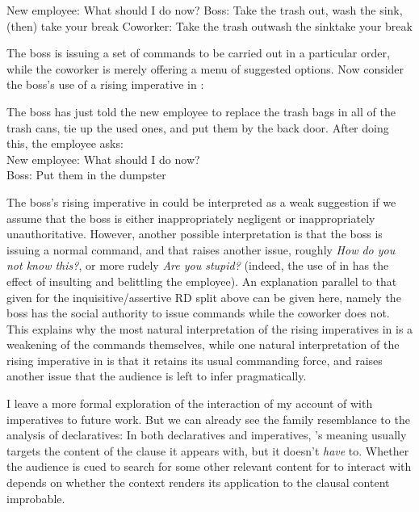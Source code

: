 \documentclass[output=paper,colorlinks,citecolor=brown]{langscibook}
\begin{document}
	\exa New employee: What should I do now?
	\ea Boss: Take the trash out, wash the sink, (then) take your break\fall \label{boss}
	\ex Coworker: Take the trash out\rise wash the sink\rise take your break\rise \label{coworker}
	\z
	\z
	
	The boss is issuing a set of commands to be carried out in a particular order, while the coworker is merely offering a menu of suggested options. Now consider the boss's use of a rising imperative in :
	
	\exa The boss has just told the new employee to replace the trash bags in all of the trash cans, tie up the used ones, and put them by the back door. After doing this, the employee asks:\\
	New employee: What should I do now?\\
	Boss: Put them in the dumpster\rise \label{bossR}
	\z
	
	The boss's rising imperative in  could be interpreted as a weak suggestion if we assume that the boss is either inappropriately negligent or inappropriately unauthoritative. However, another possible interpretation is that the boss is issuing a normal command, and that \rise raises another issue, roughly \emph{How do you not know this?}, or more rudely  \emph{Are you stupid?} (indeed, the use of \rise in  has the effect of insulting and belittling the employee). An explanation parallel to that given for the inquisitive/assertive RD split above can be given here, namely the boss has the social authority to issue commands while the coworker does not. This explains why the most natural interpretation of the rising imperatives in  is a weakening of the commands themselves, while one natural interpretation of the rising imperative in  is that it retains its usual commanding force, and \rise raises another issue that the audience is left to infer pragmatically. 
	
	I leave a more formal exploration of the interaction of my account of \rise with imperatives to future work. But we can already see the family resemblance to the analysis of declaratives: In both declaratives and imperatives, \rise's meaning usually targets the content of the clause it appears with, but it doesn't \emph{have} to. Whether the audience is cued to search for some other relevant content for \rise to interact with depends on whether the context renders its application to the clausal content improbable.
	
	
	
\end{document}
